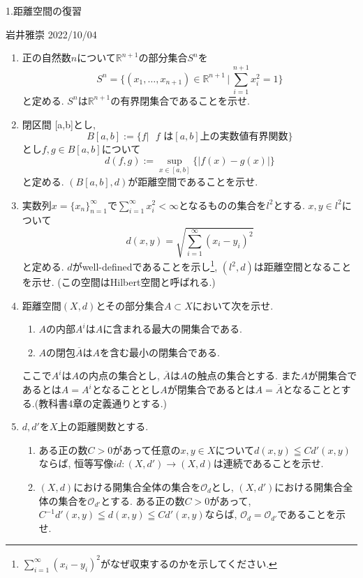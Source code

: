 \documentclass[dvipdfmx,a4paper,11pt]{article}
\newcommand{\R}{\mathbb{R}}
\theoremstyle{definition}
\begin{document}


\begin{center}
{\Large 1.距離空間の復習}
\end{center}
\begin{flushright}
 岩井雅崇 2022/10/04
\end{flushright}

\begin{enumerate}[label=\textbf{問}1.\arabic*]
\item 正の自然数$n$について$\R^{n+1}$の部分集合$S^n$を
$$
S^n = \{ (x_1, \ldots, x_{n+1}) \in \R^{n+1} \, |\,\sum_{i=1}^{n+1} x_{i}^{2} =1\}
$$
と定める. $S^n$は$\R^{n+1}$の有界閉集合であることを示せ.
\item 閉区間 [a,b]とし, 
$$
B[a,b]:= \{f | \text{ $f$ は$[a,b]$上の実数値有界関数} \}
$$
とし$f,g \in B[a,b]$について
$$
d(f,g) := \sup_{x \in [a,b]} \{ |f(x) - g(x)|\}
$$
と定める.  $(B[a,b],d)$が距離空間であることを示せ.


 \item  実数列$x = \{ x_n\}_{n=1}^{\infty}$で$\sum_{i=1}^{\infty} x_{i}^{2} < \infty$となるものの集合を$l^2$とする.
 $x,y \in l^2$について
 $$
 d(x,y) = \sqrt{ \sum_{i=1}^{\infty} (x_i - y_i)^2}
 $$
 と定める. $d$がwell-definedであることを示し\footnote{$\sum_{i=1}^{\infty} (x_i - y_i)^2$がなぜ収束するのかを示してください.}, $(l^2,d)$は距離空間となることを示せ. (この空間はHilbert空間と呼ばれる.)
 

  
 \item 距離空間$(X,d)$とその部分集合$A \subset X$において次を示せ.
	 \begin{enumerate}
 	\item $A$の内部$A^i$は$A$に含まれる最大の開集合である.
 	\item $A$の閉包$\overline{A}$は$A$を含む最小の閉集合である.
 	\end{enumerate}
 ここで$A^i$は$A$の内点の集合とし, $\overline{A}$は$A$の触点の集合とする.
 また$A$が開集合であるとは$A = A^i$となることとし$A$が閉集合であるとは$A = \overline{A}$となることとする.(教科書4章の定義通りとする.)
 
\item $d,d'$を$X$上の距離関数とする. 
	\begin{enumerate}
	\item ある正の数$C>0$があって任意の$x,y \in X$について$d(x,y) \leqq Cd'(x,y)$ならば, 恒等写像$id : (X, d') \rightarrow (X,d)$は連続であることを示せ.
	\item $(X,d)$における開集合全体の集合を$\mathscr{O}_d$とし, $(X,d')$における開集合全体の集合を$\mathscr{O}_{d'}$とする. ある正の数$C>0$があって, $C^{-1} d'(x,y)\leqq d(x,y) \leqq Cd'(x,y)$ならば, $\mathscr{O}_d = \mathscr{O}_{d'}$であることを示せ.
	\end{enumerate}


\end{enumerate}
\end{document}

